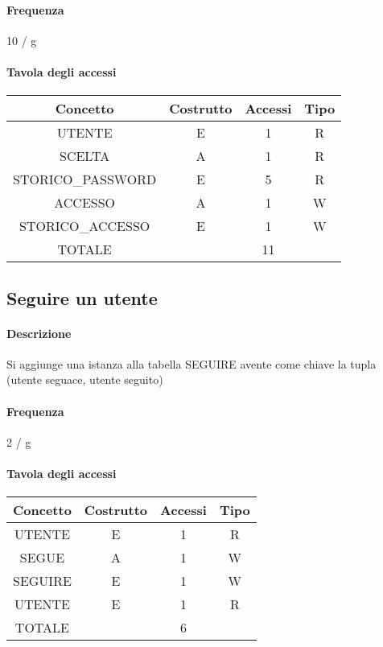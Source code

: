 \documentclass[a4paper,12pt]{report}
\begin{document}
\paragraph{Frequenza} 10 / g
\begin{table}[H]
\paragraph{Tavola degli accessi\newline}
\begin{tabular}{|c|c|c|c|}
\hline
Concetto          & Costrutto & Accessi & Tipo \\ \hline
UTENTE            & E         & 1       & R    \\ \hline
SCELTA            & A         & 1       & R    \\ \hline
STORICO\_PASSWORD & E         & 5       & R    \\ \hline
ACCESSO           & A         & 1       & W    \\ \hline
STORICO\_ACCESSO  & E         & 1       & W    \\ \hline
TOTALE            &           & 11      &      \\ \hline
\end{tabular}
\end{table}
\subsection{Seguire un utente} \label{follow}
\paragraph{Descrizione} Si aggiunge una istanza alla tabella SEGUIRE avente come chiave la tupla (utente seguace, utente seguito)
\paragraph{Frequenza} 2 / g
\begin{table}[H]
\paragraph{Tavola degli accessi\newline}
\begin{tabular}{|c|c|c|c|}
\hline
Concetto & Costrutto & Accessi & Tipo \\ \hline
UTENTE   & E         & 1       & R    \\ \hline
SEGUE    & A         & 1       & W    \\ \hline
SEGUIRE  & E         & 1       & W    \\ \hline
UTENTE   & E         & 1       & R    \\ \hline
TOTALE   &           & 6       &      \\ \hline
\end{tabular}
\end{table}
\end{document}
